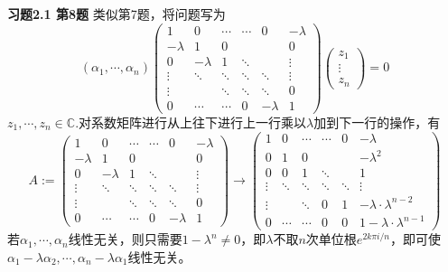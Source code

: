 \newpageorvspace

{\bf 习题2.1 第8题} 类似第7题，将问题写为
$$(\alpha_1, \cdots, \alpha_n)
\begin{pmatrix}
1 & 0 & \cdots & \cdots & 0 & -\lambda \\
-\lambda & 1 & 0 & & & 0 \\
0 & -\lambda & 1 & \ddots & & \vdots \\
\vdots & \ddots & \ddots & \ddots & \ddots & \vdots \\
\vdots & & \ddots & \ddots & \ddots & 0 \\
0 & \cdots & \cdots & 0 & -\lambda & 1
\end{pmatrix}
\begin{pmatrix}
z_1 \\ \vdots \\ z_n
\end{pmatrix} = 0
$$
$z_1, \cdots, z_n \in \mathbb{C}$.对系数矩阵进行从上往下进行上一行乘以$\lambda$加到下一行的操作，有
$$
A := \begin{pmatrix}
1 & 0 & \cdots & \cdots & 0 & -\lambda \\
-\lambda & 1 & 0 & & & 0 \\
0 & -\lambda & 1 & \ddots & & \vdots \\
\vdots & \ddots & \ddots & \ddots & \ddots & \vdots \\
\vdots & & \ddots & \ddots & \ddots & 0 \\
0 & \cdots & \cdots & 0 & -\lambda & 1
\end{pmatrix}
\to
\begin{pmatrix}
1 & 0 & \cdots & \cdots & 0 & -\lambda \\
0 & 1 & 0 & & & -\lambda^2 \\
0 & 0 & 1 & \ddots & & 1 \\
\vdots & \ddots & \ddots & \ddots & \ddots & \vdots \\
\vdots & & \ddots & 0 & 1 & -\lambda\cdot\lambda^{n-2} \\
0 & \cdots & \cdots & 0 & 0 & 1-\lambda\cdot\lambda^{n-1}
\end{pmatrix}
$$
若$\alpha_1,\cdots,\alpha_n$线性无关，则只需要$1-\lambda^{n} \neq 0$，即$\lambda$不取$n$次单位根$e^{2k\pi i/n}$，即可使$\alpha_1-\lambda\alpha_2,\cdots,\alpha_n-\lambda\alpha_1$线性无关。



